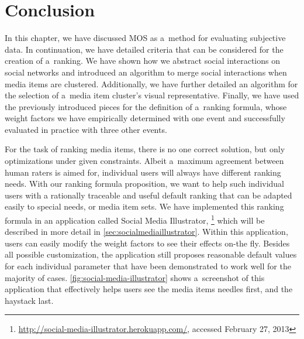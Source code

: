 \section{Conclusion}

In this chapter, we have discussed MOS as a~method
for evaluating subjective data.
In continuation, we have detailed criteria
that can be considered for the creation of a~ranking.
We have shown how we abstract social interactions on social networks
and introduced an algorithm to merge social interactions
when media items are clustered.
Additionally, we have further detailed an algorithm
for the selection of a~media item cluster's visual representative.
Finally, we have used the previously introduced pieces
for the definition of a~ranking formula,
whose weight factors we have empirically determined with one event
and successfully evaluated in practice with three other events.

For the task of ranking media items, there is no one correct solution,
but only optimizations under given constraints.
Albeit a~maximum agreement between human raters is aimed for,
individual users will always have different ranking needs.
With our ranking formula proposition, we want to help
such individual users with a rationally traceable and useful default ranking
that can be adapted easily to special needs, or media item sets.
We have implemented this ranking formula in an application
called Social Media Illustrator,%
\footnote{\url{http://social-media-illustrator.herokuapp.com/},
accessed February 27, 2013}
which will be described in more detail in \autoref{sec:socialmediaillustrator}.
Within this application,
users can easily modify the weight factors
to see their effects on-the fly.
Besides all possible customization,
the application still proposes reasonable default values
for each individual parameter that have been demonstrated
to work well for the majority of cases.
\autoref{fig:social-media-illustrator} shows a~screenshot of this application
that effectively helps users see the media items needles first, and the haystack last.

